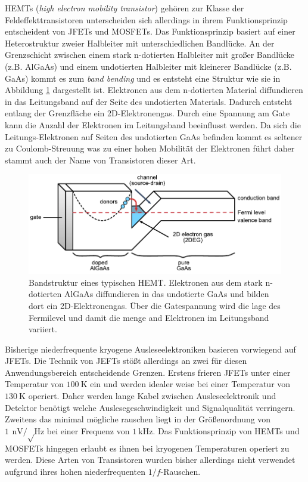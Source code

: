 HEMTs (\textit{high electron mobility transistor}) gehören zur Klasse der Feldeffekttransistoren unterscheiden sich allerdings in ihrem Funktionsprinzip entscheident von JFETs und MOSFETs.
Das Funktionsprinzip basiert auf einer Heterostruktur zweier Halbleiter mit unterschiedlichen Bandlücke.
An der Grenzschicht zwischen einem stark n-dotierten Halbleiter mit großer Bandlücke (z.B. AlGaAs) und einem undotierten Halbleiter mit kleinerer Bandlücke (z.B. GaAs) kommt es zum \textit{band bending} und es entsteht eine Struktur wie sie in Abbildung \ref{fig:HEMTBand} dargestellt ist.
Elektronen aus dem n-dotierten Material diffundieren in das Leitungsband auf der Seite des undotierten Materials.
Dadurch entsteht entlang der Grenzfläche ein 2D-Elektronengas.
Durch eine Spannung am Gate kann die Anzahl der Elektronen im Leitungsband beeinflusst werden.
Da sich die Leitungs-Elektronen auf Seiten des undotierten GaAs befinden kommt es seltener zu Coulomb-Streuung was zu einer hohen Mobilität der Elektronen führt daher stammt auch der Name von Transistoren dieser Art.\cite{HEMTFundamental, Mimura2002}

\begin{figure}[!b]
\begin{center}
\includegraphics[scale=1]{./fig/HEMTBand.pdf}
\vspace{-0.5cm}
\caption{Bandstruktur eines typischen HEMT.
Elektronen aus dem stark n-dotierten AlGaAs diffundieren in das undotierte GaAs und bilden dort ein 2D-Elektronengas.
Über die Gatespannung wird die lage des Fermilevel und damit die menge and Elektronen im Leitungsband variiert.\cite{Thomas2016}}
\label{fig:HEMTBand}
\end{center}
\end{figure}

Bisherige niederfrequente kryogene Ausleseelektroniken basieren vorwiegend auf JFETs.
Die Technik von JEFTs stößt allerdings an zwei für diesen Anwendungsbereich entscheidende Grenzen.
Erstens frieren JFETs unter einer Temperatur von $\SI{100}{\kelvin}$ ein und werden idealer weise bei einer Temperatur von $\SI{130}{\kelvin}$ operiert.
Daher werden lange Kabel zwischen Ausleseelektronik und Detektor benötigt welche Auslesegeschwindigkeit und Signalqualität verringern.
Zweitens das minimal mögliche rauschen liegt in der Größenordnung von $\SI{1}{\nano\volt\per\sqrt\hertz}$ bei einer Frequenz von $\SI{1}{\kilo\hertz}$.
Das Funktionsprinzip von HEMTs und MOSFETs hingegen erlaubt es ihnen bei kryogenen Temperaturen operiert zu werden.
Diese Arten von Transistoren wurden bisher allerdings nicht verwendet aufgrund ihres hohen niederfrequenten $1/f$-Rauschen.

